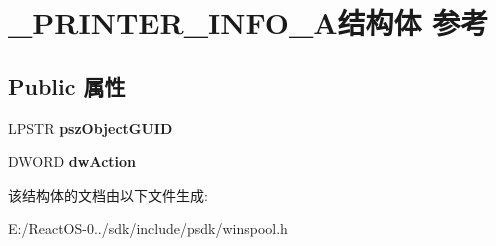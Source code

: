 \hypertarget{struct___p_r_i_n_t_e_r___i_n_f_o__7_a}{}\section{\+\_\+\+P\+R\+I\+N\+T\+E\+R\+\_\+\+I\+N\+F\+O\+\_\+A结构体 参考}
\label{struct___p_r_i_n_t_e_r___i_n_f_o__7_a}
\subsection*{Public 属性}
\begin{DoxyCompactItemize}
\item 
\mbox{\label{struct___p_r_i_n_t_e_r___i_n_f_o__7_a_a1834ef3c982ee0612fed328d632ed312}} 
L\+P\+S\+TR {\bfseries psz\+Object\+G\+U\+ID}
\item 
\mbox{\label{struct___p_r_i_n_t_e_r___i_n_f_o__7_a_a2b88846cac03fd88c0eef1141da1cf26}} 
D\+W\+O\+RD {\bfseries dw\+Action}
\end{DoxyCompactItemize}


该结构体的文档由以下文件生成\+:\begin{DoxyCompactItemize}
\item 
E\+:/\+React\+O\+S-\/0../sdk/include/psdk/winspool.\+h\end{DoxyCompactItemize}
